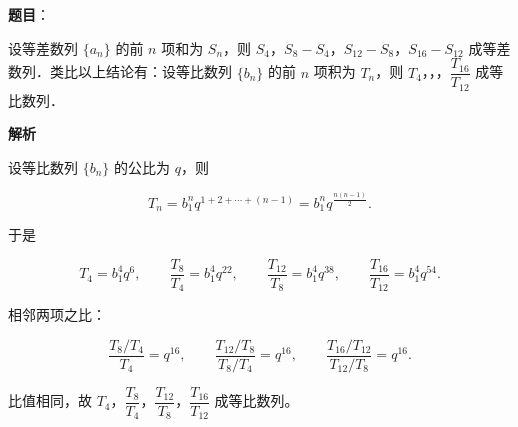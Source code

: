 \begin{answer}

\textbf{题目}：

设等差数列 $\{a_n\}$ 的前 $n$ 项和为 $S_n$，则 $S_4$，$S_8-S_4$，$S_{12}-S_8$，$S_{16}-S_{12}$ 成等差数列．类比以上结论有：设等比数列 $\{b_n\}$ 的前 $n$ 项积为 $T_n$，则 $T_4$，\gkblank{}，\gkblank{}，$\dfrac{T_{16}}{T_{12}}$ 成等比数列．

\textbf{解析}

设等比数列 $\{b_n\}$ 的公比为 $q$，则

\nopagebreak[4]
\[T_n=b_1^nq^{1+2+\cdots+(n-1)}=b_1^nq^{\frac{n(n-1)}2}.\]

于是

\nopagebreak[4]
\[T_4=b_1^4q^6,\qquad
\frac{T_8}{T_4}=b_1^4q^{22},\qquad
\frac{T_{12}}{T_8}=b_1^4q^{38},\qquad
\frac{T_{16}}{T_{12}}=b_1^4q^{54}.\]

相邻两项之比：

\nopagebreak[4]
\[\frac{T_8/T_4}{T_4}=q^{16},\qquad
\frac{T_{12}/T_8}{T_8/T_4}=q^{16},\qquad
\frac{T_{16}/T_{12}}{T_{12}/T_8}=q^{16}.\]

比值相同，故 $T_4$，$\dfrac{T_8}{T_4}$，$\dfrac{T_{12}}{T_8}$，$\dfrac{T_{16}}{T_{12}}$ 成等比数列。


\end{answer}
